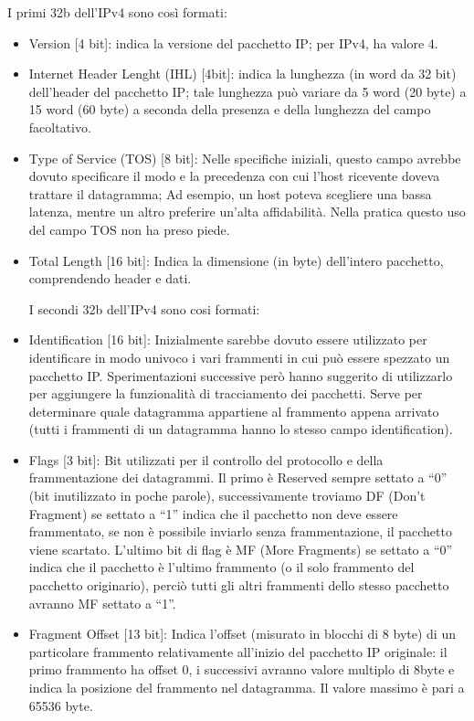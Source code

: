 I primi 32b dell’IPv4 sono così formati:
\begin{itemize}
\item	Version [4 bit]: indica la versione del pacchetto IP; per IPv4, ha valore 4.
\item	Internet Header Lenght (IHL) [4bit]: indica la lunghezza (in word da 32 bit) dell’header del pacchetto IP; tale lunghezza può variare da 5 word (20 byte) a 15 word (60 byte) a seconda della presenza e della lunghezza del campo facoltativo.
\item	Type of Service (TOS) [8 bit]: Nelle specifiche iniziali, questo campo avrebbe dovuto specificare il modo e la precedenza con cui l’host ricevente doveva trattare il datagramma;
Ad esempio, un host poteva scegliere una bassa latenza, mentre un altro preferire un’alta affidabilità. Nella pratica questo uso del campo TOS non ha preso piede.
\item	Total Length [16 bit]: Indica la dimensione (in byte) dell’intero pacchetto, comprendendo header e dati.

I secondi 32b dell’IPv4 sono cosi formati:
\item	Identification [16 bit]: Inizialmente sarebbe dovuto essere utilizzato per identificare in modo univoco i vari frammenti in cui può essere spezzato un pacchetto IP. Sperimentazioni successive però hanno suggerito di utilizzarlo per aggiungere la funzionalità di tracciamento dei pacchetti. Serve per determinare quale datagramma appartiene al frammento appena arrivato (tutti i frammenti di un datagramma hanno lo stesso campo identification).
\item	Flags [3 bit]: Bit utilizzati per il controllo del protocollo e della frammentazione dei datagrammi. Il primo è Reserved sempre settato a “0” (bit inutilizzato in poche parole), successivamente troviamo DF (Don’t Fragment) se settato a “1” indica che il pacchetto non deve essere frammentato, se non è possibile inviarlo senza frammentazione, il pacchetto viene scartato. L’ultimo bit di flag è MF (More Fragments) se settato a “0” indica che il pacchetto è l’ultimo frammento (o il solo frammento del pacchetto originario), perciò tutti gli altri frammenti dello stesso pacchetto avranno MF settato a “1”. 
\item	Fragment Offset [13 bit]: Indica l’offset (misurato in blocchi di 8 byte) di un particolare frammento relativamente all’inizio del pacchetto IP originale: il primo frammento ha offset 0, i successivi avranno valore multiplo di 8byte e indica la posizione del frammento nel datagramma. Il valore massimo è pari a 65536 byte.
\end{itemize}

